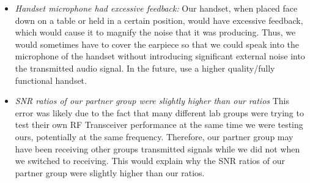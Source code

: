 \documentclass[10pt]{article}
\begin{document}
\begin{itemize}
	\item \textit{Handset microphone had excessive feedback:} Our handset, when placed face down on a table or held in a certain position, would have excessive feedback, which would cause it to magnify the noise that it was producing. Thus, we would sometimes have to cover the earpiece so that we could speak into the microphone of the handset without introducing significant external noise into the transmitted audio signal. In the future, use a higher quality/fully functional handset. 
	
	\item \textit{SNR ratios of our partner group were slightly higher than our ratios} This error was likely due to the fact that many different lab groups were trying to test their own RF Transceiver performance at the same time we were testing ours, potentially at the same frequency. Therefore, our partner group may have been receiving other groups transmitted signals while we did not when we switched to receiving. This would explain why the SNR ratios of our partner group were slightly higher than our ratios. 
\end{itemize}

\medskip

\end{document}
